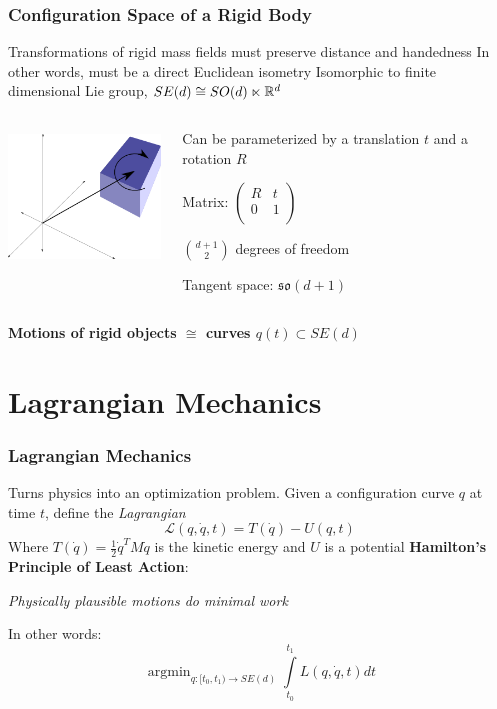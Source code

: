 \documentclass{beamer}
\begin{document}
\begin{frame}
\frametitle{Configuration Space of a Rigid Body}
Transformations of rigid mass fields must preserve distance and handedness
\pause
\vskip5pt
In other words, must be a direct Euclidean isometry
\vskip5pt
Isomorphic to finite dimensional Lie group, $SE(d) \cong SO(d) \ltimes \mathbb{R}^d$
\vskip5pt
\pause
\begin{columns}
		\begin{center}
		\includegraphics[height=1.4in]{figures/rigidbody.png}
		\end{center}
		
		\begin{center}
		Can be parameterized by a translation $t$ and a rotation $R$
		
		\vskip15pt
		
		Matrix:
		$\left( \begin{array}{cc}
			R & t \\
			0 & 1 \\
		\end{array} \right)$
		
		\vskip15pt
		${d+1 \choose{2}}$ degrees of freedom
		
		\vskip15pt
		Tangent space: $\mathfrak{so}(d+1)$
		\end{center}
\end{columns}
\pause
\vskip10pt
\begin{center}
\bf{Motions of rigid objects $\cong$ curves $q(t) \subset SE(d)$}
\end{center}
\end{frame}


\section{Lagrangian Mechanics}
\begin{frame}
\frametitle{Lagrangian Mechanics}
Turns physics into an optimization problem.
\vskip5pt
\pause
Given a configuration curve $q$ at time $t$, define the \emph{Lagrangian}
\[ \mathcal{L}(q, \dot{q}, t) = T(\dot{q}) - U(q, t) \]
Where $T(\dot{q}) = \frac{1}{2} \dot{q}^T M \dot{q}$ is the kinetic energy and $U$ is a potential
\vskip15pt
\pause
{\bf Hamilton's Principle of Least Action}:
\begin{center}
	\emph{Physically plausible motions do minimal work}
\end{center}
\vskip10pt
\pause
In other words:
\[ \mathop{\text{argmin}}_{q : [t_0, t_1) \to SE(d)} \int \limits_{t_0}^{t_1} L(q, \dot{q}, t) dt \]
\end{frame}
\end{document}
